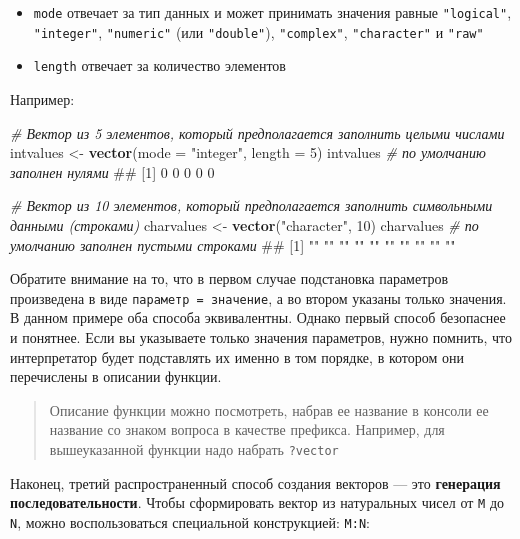 \documentclass[]{book}
\newenvironment{Shaded}{\begin{snugshade}}{\end{snugshade}}
\newcommand{\KeywordTok}[1]{\textcolor[rgb]{0.13,0.29,0.53}{\textbf{#1}}}
\newcommand{\DataTypeTok}[1]{\textcolor[rgb]{0.13,0.29,0.53}{#1}}
\newcommand{\DecValTok}[1]{\textcolor[rgb]{0.00,0.00,0.81}{#1}}
\newcommand{\StringTok}[1]{\textcolor[rgb]{0.31,0.60,0.02}{#1}}
\newcommand{\CommentTok}[1]{\textcolor[rgb]{0.56,0.35,0.01}{\textit{#1}}}
\newcommand{\NormalTok}[1]{#1}
\providecommand{\tightlist}{%
  \setlength{\itemsep}{0pt}\setlength{\parskip}{0pt}}
\begin{document}
\begin{itemize}
\tightlist
\item
  \texttt{mode} отвечает за тип данных и может принимать значения равные
  \texttt{"logical"}, \texttt{"integer"}, \texttt{"numeric"} (или
  \texttt{"double"}), \texttt{"complex"}, \texttt{"character"} и
  \texttt{"raw"}
\item
  \texttt{length} отвечает за количество элементов
\end{itemize}

Например:

\begin{Shaded}
\begin{Highlighting}[]
\CommentTok{# Вектор из 5 элементов, который предполагается заполнить целыми числами}
\NormalTok{intvalues <-}\StringTok{ }\KeywordTok{vector}\NormalTok{(}\DataTypeTok{mode =} \StringTok{"integer"}\NormalTok{, }\DataTypeTok{length =} \DecValTok{5}\NormalTok{)}
\NormalTok{intvalues }\CommentTok{# по умолчанию заполнен нулями}
\NormalTok{## [1] 0 0 0 0 0}

\CommentTok{# Вектор из 10 элементов, который предполагается заполнить символьными данными (строками)}
\NormalTok{charvalues <-}\StringTok{ }\KeywordTok{vector}\NormalTok{(}\StringTok{"character"}\NormalTok{, }\DecValTok{10}\NormalTok{)}
\NormalTok{charvalues }\CommentTok{# по умолчанию заполнен пустыми строками}
\NormalTok{##  [1] "" "" "" "" "" "" "" "" "" ""}
\end{Highlighting}
\end{Shaded}

Обратите внимание на то, что в первом случае подстановка параметров
произведена в виде \texttt{параметр\ =\ значение}, а во втором указаны
только значения. В данном примере оба способа эквивалентны. Однако
первый способ безопаснее и понятнее. Если вы указываете только значения
параметров, нужно помнить, что интерпретатор будет подставлять их именно
в том порядке, в котором они перечислены в описании функции.

\begin{quote}
Описание функции можно посмотреть, набрав ее название в консоли ее
название со знаком вопроса в качестве префикса. Например, для
вышеуказанной функции надо набрать \texttt{?vector}
\end{quote}

Наконец, третий распространенный способ создания векторов --- это
\textbf{генерация последовательности}. Чтобы сформировать вектор из
натуральных чисел от \texttt{M} до \texttt{N}, можно воспользоваться
специальной конструкцией: \texttt{M:N}:
\end{document}
